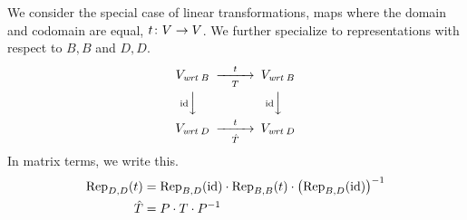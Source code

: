 \documentclass[answers, nolegalese, 11pt]{examjh}
\begin{document}
\thispagestyle{empty}
\vspace{-1ex}
\makebox[\textwidth]{\hbox{}\hrulefill\hbox{}}

We consider the special case of linear transformations,
maps where the domain and codomain are equal, 
$\map{t}{V}{V}$.
We further specialize to representations with respect to 
$B,B$ and $D,D$.
\begin{equation*}
  \begin{CD}
    V_{\wrt{B}}                   @>t>T>        V_{\wrt{B}}       \\
    @V{\scriptstyle\identity} VV              @V{\scriptstyle\identity} VV \\
    V_{\wrt{D}}                   @>t>\hat{T}>        V_{\wrt{D}}
  \end{CD}
\end{equation*}
In matrix terms, we write this.
\begin{align*} 
\rep{t}{D,D}
  &=\rep{\identity}{B,D}\cdot\rep{t}{B,B}\cdot\bigl(\rep{\identity}{B,D}\bigr)^{-1} \\
\hat{T}
  &=P\cdot T\cdot P^{-1}
\end{align*}
\end{document}
